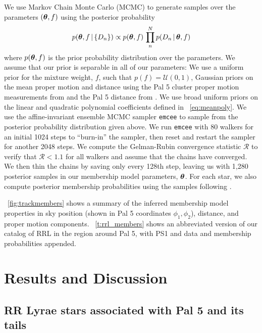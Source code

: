 \documentclass[twocolumn]{aastex63}
\begin{document}
We use Markov Chain Monte Carlo (MCMC) to generate samples over the parameters $(\boldsymbol{\theta}, f)$ using the posterior probability
\begin{equation}
    p(\bs{\theta}, f \given \{D_n\}) \propto p(\bs{\theta}, f) \, \prod_n^N p(D_n \given \bs{\theta}, f)
\end{equation}
where $p(\boldsymbol{\theta}, f)$ is the prior probability distribution over the parameters.
We assume that our prior is separable in all of our parameters: We use a uniform prior for the mixture weight, $f$, such that $p(f) = \mathcal{U}(0, 1)$, Gaussian priors on the mean proper motion and distance using the Pal 5 cluster proper motion measurements from \citet{Vasiliev:2019} and the Pal 5 distance from \citet{Kuepper:2015}.
We use broad uniform priors on the linear and quadratic polynomial coefficients defined in \equationname~\ref{eq:meanpoly}.
We use the affine-invariant ensemble MCMC sampler \texttt{emcee} \citep{emcee} to sample from the posterior probability distribution given above.
We run \texttt{emcee} with 80 walkers for an initial 1024 steps to ``burn-in'' the sampler, then reset and restart the sampler for another 2048 steps.
We compute the Gelman-Rubin convergence statistic $\mathcal{R}$ \citep{Gelman:1992} to verify that $\mathcal{R} < 1.1$ for all walkers and assume that the chains have converged.
We then thin the chains by saving only every 128th step, leaving us with 1,280 posterior samples in our membership model parameters, $\boldsymbol{\theta}$.
For each star, we also compute posterior membership probabilities using the samples following \citet{DFM:blog}.

\figurename~\ref{fig:trackmembers} shows a summary of the inferred membership model properties in sky position (shown in Pal 5 coordinates $\phi_1, \phi_2$), distance, and proper motion components.
\tablename~\ref{t:rrl_members} shows an abbreviated version of our catalog of RRL in the region around Pal 5, with PS1 and \Gaia data and membership probabilities appended.

\section{Results and Discussion} \label{sec:results}

\subsection{RR Lyrae stars associated with Pal 5 and its tails}
\end{document}
